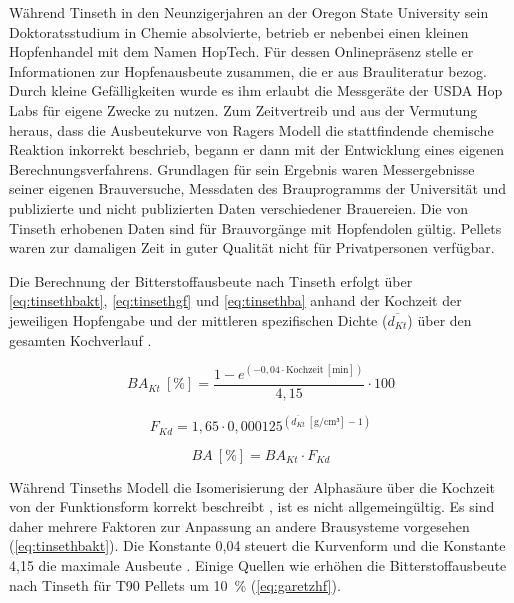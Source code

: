 \documentclass[a4paper,parskip=half]{scrartcl}
\newcommand{\BA}{\mathit{BA}}
\newcommand{\BAKt}{{\mathit{BA}}_{\mathit{Kt}}}
\newcommand{\umin}{\:[\textrm{min}]}
\newcommand{\uden}{\:[\text{g/cm³}]}
\newcommand{\uper}{\:[\text{\%}]}
\newcommand{\FKd}{F_{\mathit{Kd}}}
\newcommand{\dKt}{\overline{d_{\mathit{Kt}}}}
\begin{document}
Während Tinseth in den Neunzigerjahren an der Oregon State University sein Doktoratsstudium in Chemie absolvierte, betrieb er nebenbei einen kleinen Hopfenhandel mit dem Namen HopTech. Für dessen Onlinepräsenz stelle er Informationen zur Hopfenausbeute zusammen, die er aus Brauliteratur bezog. Durch kleine Gefälligkeiten wurde es ihm erlaubt die Messgeräte der USDA Hop Labs für eigene Zwecke zu nutzen. Zum Zeitvertreib und aus der Vermutung heraus, dass die Ausbeutekurve von Ragers Modell die stattfindende chemische Reaktion inkorrekt beschrieb, begann er dann mit der Entwicklung eines eigenen Berechnungsverfahrens. Grundlagen für sein Ergebnis waren Messergebnisse seiner eigenen Brauversuche, Messdaten des Brauprogramms der Universität und publizierte und nicht publizierten Daten verschiedener Brauereien. Die von Tinseth erhobenen Daten sind für Brauvorgänge mit Hopfendolen gültig. Pellets waren zur damaligen Zeit in guter Qualität nicht für Privatpersonen verfügbar. \parencites[0:55:45-1:08:00]{Beechum2017a}[2:10-6:30]{Smith2011}

Die Berechnung der Bitterstoffausbeute nach Tinseth erfolgt über \autoref{eq:tinsethbakt}, \autoref{eq:tinsethgf} und \autoref{eq:tinsethba} anhand der Kochzeit der jeweiligen Hopfengabe und der mittleren spezifischen Dichte ($\dKt$) über den gesamten Kochverlauf \parencite{Tinseth1997}.

\begin{equation}
\BAKt \uper = \frac{1 - e^{\left(-0,04 \cdot \text{Kochzeit} \umin \right)}}{4,15} \cdot 100
\label{eq:tinsethbakt}
\end{equation}

\begin{equation}
\FKd = 1,65 \cdot 0,000125^{\left(\overline{d_{\mathit{Kt}}} \uden - 1 \right)}
\label{eq:tinsethgf}
\end{equation}

\begin{equation}
\BA \uper = \BAKt \cdot \FKd
\label{eq:tinsethba}
\end{equation}

Während Tinseths Modell die Isomerisierung der Alphasäure über die Kochzeit von der Funktionsform korrekt beschreibt \parencite[43]{Malowicki2005}, ist es nicht allgemeingültig. Es sind daher mehrere Faktoren zur Anpassung an andere Brausysteme vorgesehen (\autoref{eq:tinsethbakt}). Die Konstante 0,04 steuert die Kurvenform und die Konstante 4,15 die maximale Ausbeute \parencite{Tinseth1997}. Einige Quellen wie \textcite{Novotny2018} erhöhen die Bitterstoffausbeute nach Tinseth für T90 Pellets um 10~\% (\autoref{eq:garetzhf}).
\end{document}
